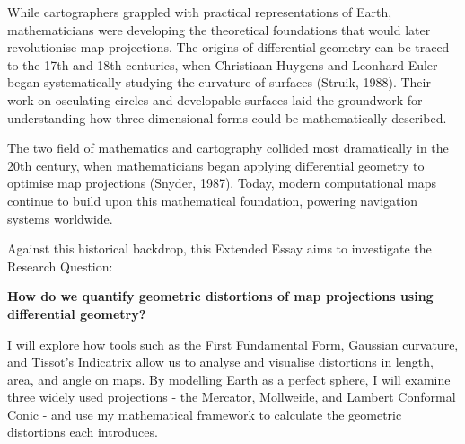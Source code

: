 While cartographers grappled with practical representations of Earth, 
mathematicians were developing the theoretical foundations that would later 
revolutionise map projections. The origins of differential geometry can be 
traced to the 17th and 18th centuries, when Christiaan Huygens and Leonhard 
Euler began systematically studying the curvature of surfaces (Struik, 1988). 
Their work on osculating circles and developable surfaces laid the groundwork 
for understanding how three-dimensional forms could be mathematically 
described.

The two field of mathematics and cartography collided most dramatically in the 
20th century, when mathematicians began applying differential geometry to 
optimise map projections (Snyder, 1987). Today, modern computational maps 
continue to build upon this mathematical foundation, powering navigation 
systems worldwide. 

Against this historical backdrop, this Extended Essay aims to investigate the 
Research Question:

\textbf{How do we quantify geometric distortions of map projections using differential 
geometry?}

I will explore how tools such as the First Fundamental Form, Gaussian 
curvature, and Tissot's Indicatrix allow us to analyse and visualise 
distortions in length, area, and angle on maps. By modelling Earth as a 
perfect sphere, I will examine three widely used projections - the Mercator, 
Mollweide, and Lambert Conformal Conic - and use my mathematical framework to 
calculate the geometric distortions each introduces.
